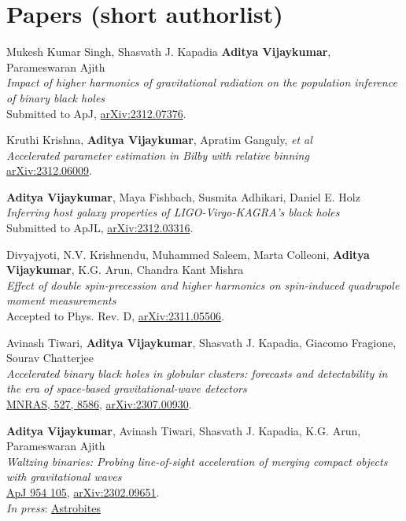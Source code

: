     \section{Papers (short authorlist)}
\begin{etaremune}
	\item
	Mukesh Kumar Singh, Shasvath J. Kapadia \textbf{Aditya Vijaykumar}, Parameswaran Ajith  \\
	\textit{Impact of higher harmonics of gravitational radiation on the population inference of binary black holes}\\
	Submitted to ApJ, \href{https://arxiv.org/abs/2312.07376}{arXiv:2312.07376}.

	\item
	Kruthi Krishna, \textbf{Aditya Vijaykumar}, Apratim Ganguly, \textit{et al}  \\
	\textit{Accelerated parameter estimation in Bilby with relative binning}\\
	\href{https://arxiv.org/abs/2312.06009}{arXiv:2312.06009}.

    \item
	\textbf{Aditya Vijaykumar}, Maya Fishbach, Susmita Adhikari, Daniel E. Holz  \\
	\textit{Inferring host galaxy properties of LIGO-Virgo-KAGRA's black holes
}\\
	Submitted to ApJL, \href{https://arxiv.org/abs/2312.03316}{arXiv:2312.03316}.

	\item
	Divyajyoti, N.V. Krishnendu, Muhammed Saleem, Marta Colleoni, \textbf{Aditya Vijaykumar}, K.G. Arun, Chandra Kant Mishra  \\
	\textit{Effect of double spin-precession and higher harmonics on spin-induced quadrupole moment measurements}\\
	Accepted to Phys. Rev. D, \href{https://arxiv.org/abs/2311.05506}{arXiv:2311.05506}.

	\item
	Avinash Tiwari, \textbf{Aditya Vijaykumar}, Shasvath J. Kapadia, Giacomo Fragione, Sourav Chatterjee  \\
	\textit{Accelerated binary black holes in globular clusters: forecasts and detectability in the era of space-based gravitational-wave detectors}\\
	\href{https://academic.oup.com/mnras/article/527/3/8586/7459933}{MNRAS, 527, 8586}, \href{https://arxiv.org/abs/2307.00930}{arXiv:2307.00930}.

	\item
	\textbf{Aditya Vijaykumar}, Avinash Tiwari, Shasvath J. Kapadia, K.G. Arun, Parameswaran Ajith  \\
	\textit{Waltzing binaries: Probing line-of-sight acceleration of merging compact objects with gravitational waves}\\
	\href{https://iopscience.iop.org/article/10.3847/1538-4357/acd77d}{ApJ 954 105}, \href{https://arxiv.org/abs/2302.09651}{arXiv:2302.09651}.\\
    \textit{In press}: \href{https://astrobites.org/2023/03/17/grab-doppler-dance-partner/}{Astrobites}
	

\end{etaremune}
